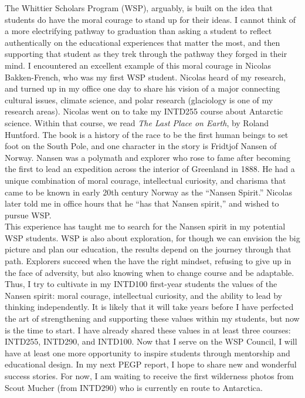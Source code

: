 \documentclass[../../main.tex]{subfiles}
\begin{document}
The Whittier Scholars Program (WSP), arguably, is built on the idea that students do have the moral courage to stand up for their ideas.  I cannot think of a more electrifying pathway to graduation than asking a student to reflect authentically on the educational experiences that matter the most, and then supporting that student as they trek through the pathway they forged in their mind.  I encountered an excellent example of this moral courage in Nicolas Bakken-French, who was my first WSP student.  Nicolas heard of my research, and turned up in my office one day to share his vision of a major connecting cultural issues, climate science, and polar research (glaciology is one of my research areas).  Nicolas went on to take my INTD255 course about Antarctic science.  Within that course, we read \textit{The Last Place on Earth}, by Roland Huntford.  The book is a history of the race to be the first human beings to set foot on the South Pole, and one character in the story is Fridtjof Nansen of Norway.  Nansen was a polymath and explorer who rose to fame after becoming the first to lead an expedition across the interior of Greenland in 1888.  He had a unique combination of moral courage, intellectual curiosity, and charisma that came to be known in early 20th century Norway as the ``Nansen Spirit.''  Nicolas later told me in office hours that he ``has that Nansen spirit,'' and wished to pursue WSP.
\\
\vspace{0.15cm}
This experience has taught me to search for the Nansen spirit in my potential WSP students.  WSP is also about exploration, for though we can envision the big picture and plan our education, the results depend on the journey through that path.  Explorers succeed when the have the right mindset, refusing to give up in the face of adversity, but also knowing when to change course and be adaptable.  Thus, I try to cultivate in my INTD100 first-year students the values of the Nansen spirit: moral courage, intellectual curiosity, and the ability to lead by thinking independently.  It is likely that it will take years before I have perfected the art of strengthening and supporting these values within my students, but now is the time to start.  I have already shared these values in at least three courses: INTD255, INTD290, and INTD100.  Now that I serve on the WSP Council, I will have at least one more opportunity to inspire students through mentorship and educational design.  In my next PEGP report, I hope to share new and wonderful success stories.  For now, I am waiting to receive the first wilderness photos from Scout Mucher (from INTD290) who is currently en route to Antarctica.
\end{document}
